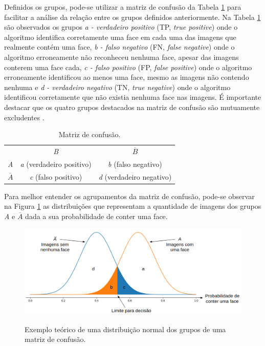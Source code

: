 Definidos os grupos, pode-se utilizar a matriz de confusão da Tabela \ref{tab:matriz_de_confusao} para facilitar a análise da relação entre os grupos definidos anteriormente. Na Tabela \ref{tab:matriz_de_confusao} são observados os grupos \textit{a - verdadeiro positivo} (TP, \textit{true positive}) onde o algoritmo identifica corretamente uma face em cada uma das imagens que realmente contém uma face, \textit{b - falso negativo} (FN, \textit{false negative}) onde o algoritmo erroneamente não reconheceu nenhuma face, apesar das imagens conterem uma face cada, \textit{c - falso positivo} (FP, \textit{false positive}) onde o algoritmo erroneamente identificou ao menos uma face, mesmo as imagens não contendo nenhuma e \textit{d - verdadeiro negativo} (TN, \textit{true negative}) onde o algoritmo identificou corretamente que não existia nenhuma face nas imagens. É importante destacar que os quatro grupos destacados na matriz de confusão são mutuamente excludentes \cite{Dougherty:2012:PRC:2553126}.

\begin{table}[htbp]
    \caption{Matriz de confusão.}
    \label{tab:matriz_de_confusao}
    \centering
    \begin{tabular}{ccc}\hline\hline
                       & \textit{B}                       & $\overline{B}$                   \\
        \textit{A}     & \textit{a} (verdadeiro positivo) & \textit{b} (falso negativo)      \\
        $\overline{A}$ & \textit{c} (falso positivo)      & \textit{d} (verdadeiro negativo) \\
        \hline\hline
    \end{tabular}
\end{table}

Para melhor entender os agrupamentos da matriz de confusão, pode-se observar na Figura \ref{fig:norm_dist} as distribuições que representam a quantidade de imagens dos grupos \textit{A} e $\overline{A}$ dada a sua probabilidade de conter uma face.

\begin{figure}[htb]
    \centering
    \caption{Exemplo teórico de uma distribuição normal dos grupos de uma matriz de confusão.}
    \includegraphics[scale=.4]{figs/norm_dist.png}
    \label{fig:norm_dist}
\end{figure}

